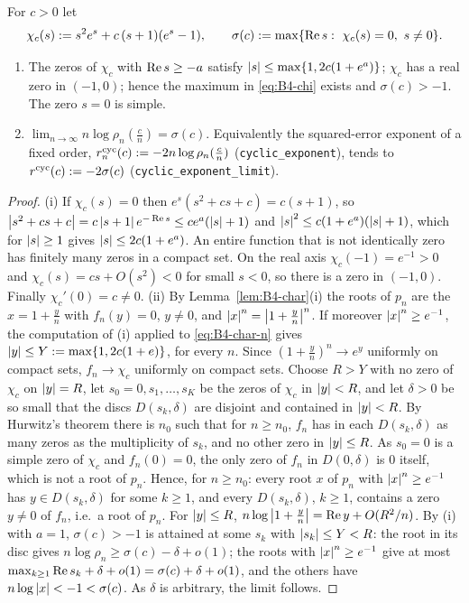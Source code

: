 \begin{proposition}\label{prop:B4-cyclic-limit}
For $c>0$ let
\begin{equation}\label{eq:B4-chi}
\chi_c(s):=s^2e^s+c\,(s+1)(e^s-1),\qquad \sigma(c):=\max\{\Real s:\ \chi_c(s)=0,\ s\ne0\}.
\end{equation}
\begin{enumerate}[label=(\roman*)]
\item The zeros of $\chi_c$ with $\operatorname{Re} s\ge-a$ satisfy $\left|s\right|\le\max\{1,2c(1+e^a)\}$; $\chi_c$ has a real zero in $(-1,0)$; hence the maximum in \eqref{eq:B4-chi} exists and $\sigma(c)>-1$. The zero $s=0$ is simple.
\item $\lim_{n\to\infty}n\log\rho_n(\frac cn)=\sigma(c)$. Equivalently the squared-error exponent of a fixed order, $r^{\rm cyc}_n(c):=-2n\log\rho_n(\frac cn)$ (\texttt{cyclic\_exponent}), tends to $r^{\rm cyc}(c):=-2\sigma(c)$ (\texttt{cyclic\_exponent\_limit}).
\end{enumerate}
\end{proposition}
\begin{proof}
(i) If $\chi_c(s)=0$ then $e^s(s^2+cs+c)=c(s+1)$, so $\left|s^2+cs+c\right|=c\left|s+1\right|e^{-\operatorname{Re} s}\le ce^a(\left|s\right|+1)$ and $\left|s\right|^2\le c(1+e^a)(\left|s\right|+1)$, which for $\left|s\right|\ge1$ gives $\left|s\right|\le2c(1+e^a)$. An entire function that is not identically zero has finitely many zeros in a compact set. On the real axis $\chi_c(-1)=e^{-1}>0$ and $\chi_c(s)=cs+O(s^2)<0$ for small $s<0$, so there is a zero in $(-1,0)$. Finally $\chi_c'(0)=c\ne0$.
(ii) By Lemma~\ref{lem:B4-char}(i) the roots of $p_n$ are the $x=1+\frac yn$ with $f_n(y)=0$, $y\ne0$, and $\left|x\right|^n=\left|1+\frac yn\right|^n$. If moreover $\left|x\right|^n\ge e^{-1}$, the computation of (i) applied to \eqref{eq:B4-char-n} gives $\left|y\right|\le Y:=\max\{1,2c(1+e)\}$, for every $n$. Since $(1+\frac yn)^n\to e^y$ uniformly on compact sets, $f_n\to\chi_c$ uniformly on compact sets. Choose $R>Y$ with no zero of $\chi_c$ on $\left|y\right|=R$, let $s_0=0,s_1,\dots,s_K$ be the zeros of $\chi_c$ in $\left|y\right|<R$, and let $\delta>0$ be so small that the discs $D(s_k,\delta)$ are disjoint and contained in $\left|y\right|<R$. By Hurwitz's theorem there is $n_0$ such that for $n\ge n_0$, $f_n$ has in each $D(s_k,\delta)$ as many zeros as the multiplicity of $s_k$, and no other zero in $\left|y\right|\le R$. As $s_0=0$ is a simple zero of $\chi_c$ and $f_n(0)=0$, the only zero of $f_n$ in $D(0,\delta)$ is $0$ itself, which is not a root of $p_n$. Hence, for $n\ge n_0$: every root $x$ of $p_n$ with $\left|x\right|^n\ge e^{-1}$ has $y\in D(s_k,\delta)$ for some $k\ge1$, and every $D(s_k,\delta)$, $k\ge1$, contains a zero $y\ne0$ of $f_n$, i.e.\ a root of $p_n$. For $\left|y\right|\le R$, $n\log\left|1+\frac yn\right|=\operatorname{Re} y+O(R^2/n)$. By (i) with $a=1$, $\sigma(c)>-1$ is attained at some $s_k$ with $\left|s_k\right|\le Y<R$: the root in its disc gives $n\log\rho_n\ge\sigma(c)-\delta+o(1)$; the roots with $\left|x\right|^n\ge e^{-1}$ give at most $\max_{k\ge1}\operatorname{Re} s_k+\delta+o(1)=\sigma(c)+\delta+o(1)$, and the others have $n\log\left|x\right|<-1<\sigma(c)$. As $\delta$ is arbitrary, the limit follows.
\end{proof}

